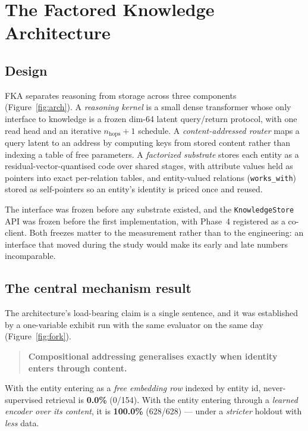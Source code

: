 \section{The Factored Knowledge Architecture}
\label{sec:arch}

\subsection{Design}

FKA separates reasoning from storage across three components (Figure~\ref{fig:arch}). A
\emph{reasoning kernel} is a small dense transformer whose only interface to knowledge is a
frozen dim-64 latent query/return protocol, with one read head and an iterative $n_{\text{hops}}{+}1$
schedule.
A \emph{content-addressed router} maps a query latent to an address by computing keys from stored
content rather than indexing a table of free parameters. A \emph{factorized substrate} stores each
entity as a residual-vector-quantised code over shared stages, with attribute values held as
pointers into exact per-relation tables, and entity-valued relations
(\texttt{works\_with}) stored as self-pointers so an entity's identity is priced once and reused.

The interface was frozen before any substrate existed, and the \texttt{KnowledgeStore} API was
frozen before the first implementation, with Phase~4 registered as a co-client.
Both freezes matter to the measurement rather than to the engineering: an interface that moved
during the study would make its early and late numbers incomparable.

\subsection{The central mechanism result}
\label{sec:fork}

The architecture's load-bearing claim is a single sentence, and it was established by a one-variable
exhibit run with the same evaluator on the same day (Figure~\ref{fig:fork}).

\begin{quote}
\textbf{Compositional addressing generalises exactly when identity enters through content.}
\end{quote}

With the entity entering as a \emph{free embedding row} indexed by entity id, never-supervised
retrieval is \textbf{0.0\%} (0/154).
With the entity entering through a \emph{learned encoder over its content}, it is
\textbf{100.0\%} (628/628) --- under a \emph{stricter} holdout with \emph{less} data.


